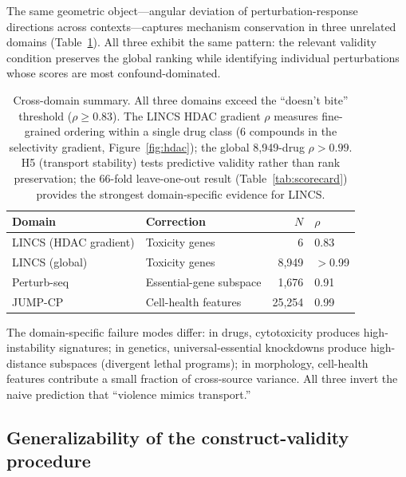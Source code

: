 \documentclass[10pt]{article}
\begin{document}
The same geometric object---angular deviation of perturbation-response
directions across contexts---captures mechanism conservation in three
unrelated domains (Table~\ref{tab:cross_domain}). All three exhibit the
same pattern: the relevant validity condition preserves the global ranking
while identifying individual perturbations whose scores are most
confound-dominated.

\begin{table}[t]
\centering
\caption{Cross-domain summary. All three domains exceed the ``doesn't
bite'' threshold ($\rho \geq 0.83$). The LINCS HDAC gradient $\rho$
measures fine-grained ordering within a single drug class (6 compounds
in the selectivity gradient, Figure~\ref{fig:hdac});
the global 8{,}949-drug $\rho > 0.99$. H5 (transport stability) tests
predictive validity rather than rank preservation; the 66-fold
leave-one-out result (Table~\ref{tab:scorecard}) provides the strongest
domain-specific evidence for LINCS.}
\label{tab:cross_domain}
\small
\begin{tabular}{llrl}
\toprule
Domain & Correction & $N$ & $\rho$ \\
\midrule
LINCS (HDAC gradient) & Toxicity genes & 6 & 0.83 \\
LINCS (global) & Toxicity genes & 8{,}949 & $>$0.99 \\
Perturb-seq & Essential-gene subspace & 1{,}676 & 0.91 \\
JUMP-CP & Cell-health features & 25{,}254 & 0.99 \\
\bottomrule
\end{tabular}
\end{table}

The domain-specific failure modes differ: in drugs, cytotoxicity
produces high-instability signatures; in genetics, universal-essential
knockdowns produce high-distance subspaces (divergent lethal programs);
in morphology, cell-health features contribute a small fraction of
cross-source variance. All three invert the naive prediction that
``violence mimics transport.''

\subsection{Generalizability of the construct-validity procedure}
\end{document}

